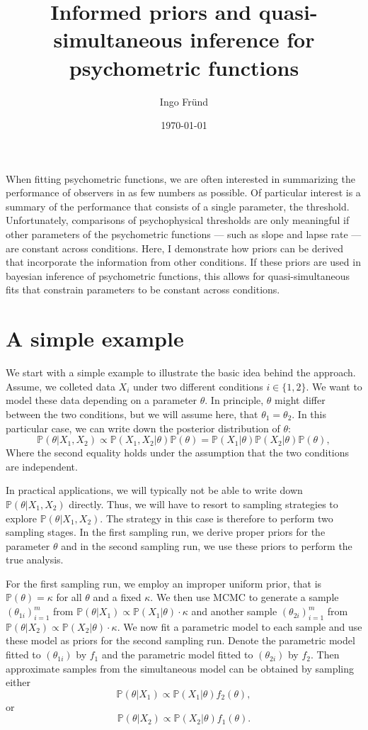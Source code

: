 \documentclass[a4paper,11pt]{scrartcl}
\title{Informed priors and quasi-simultaneous inference for psychometric functions}
\author{Ingo Fründ}
\date{\today}
\def\prob{\mathbb{P}}
\begin{document}
\maketitle
When fitting psychometric functions, we are often interested in summarizing the performance of observers in as few numbers as possible.
Of particular interest is a summary of the performance that consists of a single parameter, the threshold.
Unfortunately, comparisons of psychophysical thresholds are only meaningful if other parameters of the psychometric functions --- such as slope and lapse rate --- are constant across conditions.
Here, I demonstrate how priors can be derived that incorporate the information from other conditions.
If these priors are used in bayesian inference of psychometric functions, this allows for quasi-simultaneous fits that constrain parameters to be constant across conditions.

\section{A simple example}

We start with a simple example to illustrate the basic idea behind the approach.
Assume, we colleted data $X_i$ under two different conditions $i\in\{1,2\}$.
We want to model these data depending on a parameter $\theta$.
In principle, $\theta$ might differ between the two conditions, but we will assume here, that $\theta_1=\theta_2$.
In this particular case, we can write down the posterior distribution of $\theta$:
%
$$
\prob(\theta|X_1,X_2) \propto \prob(X_1,X_2|\theta) \prob(\theta) = \prob(X_1|\theta)\prob(X_2|\theta)\prob(\theta),
$$
%
Where the second equality holds under the assumption that the two conditions are independent.

In practical applications, we will typically not be able to write down $\prob(\theta|X_1,X_2)$ directly.
Thus, we will have to resort to sampling strategies to explore $\prob(\theta|X_1,X_2)$.
The strategy in this case is therefore to perform two sampling stages.
In the first sampling run, we derive proper priors for the parameter $\theta$ and in the second sampling run, we use these priors to perform the true analysis.

For the first sampling run, we employ an improper uniform prior, that is $\prob(\theta)=\kappa$ for all $\theta$ and a fixed $\kappa$.
We then use MCMC to generate a sample $(\theta_{1i})_{i=1}^m$ from $\prob(\theta|X_1)\propto\prob(X_1|\theta)\cdot\kappa$ and another sample
$(\theta_{2i})_{i=1}^m$ from $\prob(\theta|X_2)\propto\prob(X_2|\theta)\cdot\kappa$.
We now fit a parametric model to each sample and use these model as priors for the second sampling run.
Denote the parametric model fitted to $(\theta_{1i})$ by $f_1$ and the parametric model fitted to $(\theta_{2i})$ by $f_2$.
Then approximate samples from the simultaneous model can be obtained by sampling either
%
$$
\prob(\theta|X_1) \propto\prob(X_1|\theta)f_2(\theta),
$$
%
or
%
$$
\prob(\theta|X_2) \propto\prob(X_2|\theta)f_1(\theta).
$$
%
\end{document}
